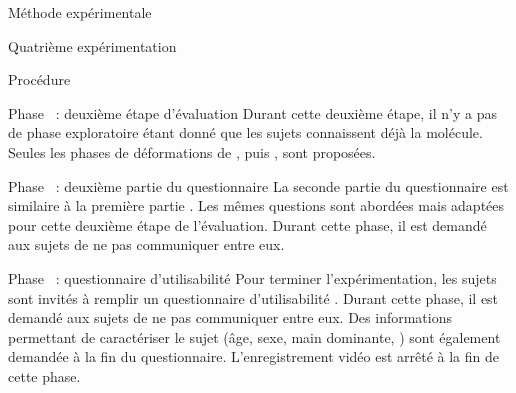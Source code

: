 \documentclass[myfrancais,ngerman,english,french]{mythesis}
\begin{document}
\begin{mychapter}{Méthode expérimentale}
\begin{mysection}{Quatrième expérimentation}
\begin{mysubsection}{Procédure}
\begin{myparagraph}{Phase~ : deuxième étape d'évaluation}
					Durant cette deuxième étape, il n'y a pas de phase exploratoire étant donné que les sujets connaissent déjà la molécule.
					Seules les phases de déformations de , \myUbiquitin puis \myNusENusG, sont proposées.
				\end{myparagraph}
				\begin{myparagraph}{Phase~ : deuxième partie du questionnaire}
					La seconde partie du questionnaire est similaire à la première partie .
					Les mêmes questions sont abordées mais adaptées pour cette deuxième étape de l'évaluation.
					Durant cette phase, il est demandé aux sujets de ne pas communiquer entre eux.
				\end{myparagraph}
				\begin{myparagraph}{Phase~ : questionnaire d'utilisabilité}
					Pour terminer l'expérimentation, les sujets sont invités à remplir un questionnaire d'utilisabilité .
					Durant cette phase, il est demandé aux sujets de ne pas communiquer entre eux.
					Des informations permettant de caractériser le sujet (âge, sexe, main dominante, \myetc) sont également demandée à la fin du questionnaire.
					L'enregistrement vidéo est arrêté à la fin de cette phase.
				\end{myparagraph}
			\end{mysubsection}
		\end{mysection}
	\end{mychapter}
\end{document}
